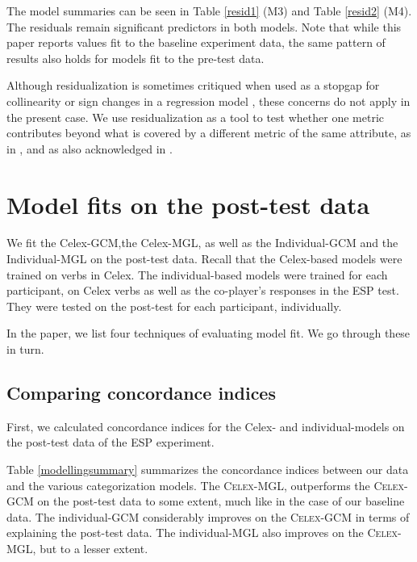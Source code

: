 \documentclass[12pt]{article}
\begin{document}
The model summaries can be seen in Table \ref{resid1} (M3) and Table \ref{resid2} (M4). The residuals remain significant predictors in both models. Note that while this paper reports values fit to the baseline experiment data, the same pattern of results also holds for models fit to the pre-test data.

Although residualization is sometimes critiqued when used as a stopgap for collinearity or sign changes in a regression model \citep{wurm2014residualizing}, these concerns do not apply in the present case.  We use residualization as a tool to test whether one metric contributes beyond what is covered by a different metric of the same attribute, as in 
\cite{baayen2006morphological}, and as also acknowledged in \cite{wurm2014residualizing}. 

\section{Model fits on the post-test data}

We fit the Celex-GCM,the Celex-MGL, as well as the Individual-GCM and the Individual-MGL on the post-test data. Recall that the Celex-based models were trained on verbs in Celex. The individual-based models were trained for each participant, on Celex verbs as well as the co-player's responses in the ESP test. They were tested on the post-test for each participant, individually.

In the paper, we list four techniques of evaluating model fit. We go through these in turn.

\subsection{Comparing concordance indices}

First, we calculated concordance indices for the Celex- and individual-models on the post-test data of the ESP experiment.


Table \ref{modellingsummary} summarizes the concordance indices between our data and the various categorization models. The \textsc{Celex}-MGL, outperforms the \textsc{Celex}-GCM on the post-test data to some extent, much like in the case of our baseline data. The individual-GCM considerably improves on the \textsc{Celex}-GCM in terms of explaining the post-test data. The individual-MGL also improves on the \textsc{Celex}-MGL, but to a lesser extent.
\end{document}
